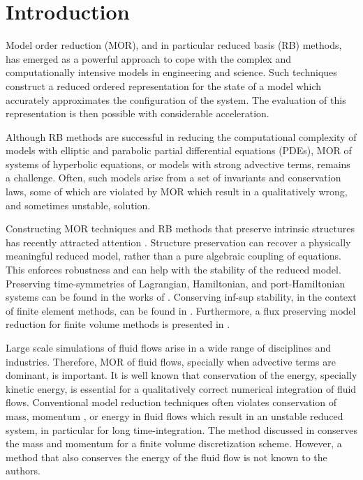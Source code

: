 \section{Introduction} \label{sec:intro}

Model order reduction (MOR), and in particular reduced basis (RB) methods, has emerged as a powerful approach to cope with the complex and computationally intensive models in engineering and science. Such techniques construct a reduced ordered representation for the state of a model which accurately approximates the configuration of the system. The evaluation of this representation is then possible with considerable acceleration.

Although RB methods are successful in reducing the computational complexity of models with elliptic and parabolic partial differential equations (PDEs), MOR of systems of hyperbolic equations, or models with strong advective terms, remains a challenge. Often, such models arise from a set of invariants and conservation laws, some of which are violated by MOR which result in a qualitatively wrong, and sometimes unstable, solution.

Constructing MOR techniques and RB methods that preserve intrinsic structures has recently attracted attention \cite{doi:10.1137/17M1111991,1705.00498,kalashnikova2014stabilization,farhat2015structure,doi:10.1137/110836742,beattie2011structure,doi:10.1137/140978922}. Structure preservation can recover a physically meaningful reduced model, rather than a pure algebraic coupling of equations. This enforces robustness and can help with the stability of the reduced model. Preserving time-symmetries of Lagrangian, Hamiltonian, and port-Hamiltonian systems can be found in the works of \cite{Carlberg:2014ky,doi:10.1137/140978922,doi:10.1137/17M1111991,1705.00498,beattie2011structure,chaturantabut2016structure,gugercin2012structure}. Conserving inf-sup stability, in the context of finite element methods, can be found in \cite{farhat2015structure,ballarin2015supremizer}. Furthermore, a flux preserving model reduction for finite volume methods is presented in \cite{carlberg2018conservative}. 

Large scale simulations of fluid flows arise in a wide range of disciplines and industries. Therefore, MOR of fluid flows, specially when advective terms are dominant, is important. It is well known that conservation of the energy, specially kinetic energy, is essential for a qualitatively correct numerical integration of fluid flows. Conventional model reduction techniques often violates conservation of mass, momentum \cite{carlberg2018conservative}, or energy in fluid flows which result in an unstable reduced system, in particular for long time-integration. The method discussed in \cite{carlberg2018conservative} conserves the mass and momentum for a finite volume discretization scheme. However, a method that also conserves the energy of the fluid flow is not known to the authors.

